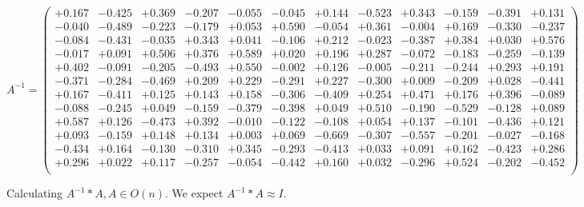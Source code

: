 \documentclass[9pt]{article}
\theoremstyle{plain}
\theoremstyle{definition}
\theoremstyle{remark}
\numberwithin{equation}{section}
\begin{document}
$A^{-1} = \left(
\begin{array}{
cccccccccccc}
+0.167 & -0.425 & +0.369 & -0.207 & -0.055 & -0.045 & +0.144 & -0.523 & +0.343 & -0.159 & -0.391 & +0.131 \\
-0.040 & -0.489 & -0.223 & -0.179 & +0.053 & +0.590 & -0.054 & +0.361 & -0.004 & +0.169 & -0.330 & -0.237 \\
-0.084 & -0.431 & -0.035 & +0.343 & +0.041 & -0.106 & +0.212 & -0.023 & -0.387 & +0.384 & +0.030 & +0.576 \\
-0.017 & +0.091 & +0.506 & +0.376 & +0.589 & +0.020 & +0.196 & +0.287 & -0.072 & -0.183 & -0.259 & -0.139 \\
+0.402 & -0.091 & -0.205 & -0.493 & +0.550 & -0.002 & +0.126 & -0.005 & -0.211 & -0.244 & +0.293 & +0.191 \\
-0.371 & -0.284 & -0.469 & +0.209 & +0.229 & -0.291 & +0.227 & -0.300 & +0.009 & -0.209 & +0.028 & -0.441 \\
+0.167 & -0.411 & +0.125 & +0.143 & +0.158 & -0.306 & -0.409 & +0.254 & +0.471 & +0.176 & +0.396 & -0.089 \\
-0.088 & -0.245 & +0.049 & -0.159 & -0.379 & -0.398 & +0.049 & +0.510 & -0.190 & -0.529 & -0.128 & +0.089 \\
+0.587 & +0.126 & -0.473 & +0.392 & -0.010 & -0.122 & -0.108 & +0.054 & +0.137 & -0.101 & -0.436 & +0.121 \\
+0.093 & -0.159 & +0.148 & +0.134 & +0.003 & +0.069 & -0.669 & -0.307 & -0.557 & -0.201 & -0.027 & -0.168 \\
-0.434 & +0.164 & -0.130 & -0.310 & +0.345 & -0.293 & -0.413 & +0.033 & +0.091 & +0.162 & -0.423 & +0.286 \\
+0.296 & +0.022 & +0.117 & -0.257 & -0.054 & -0.442 & +0.160 & +0.032 & -0.296 & +0.524 & -0.202 & -0.452 \\
\end{array}
\right)$ \newline 

Calculating $A^{-1} *A  ,  A \in O(n)$.   We expect $A^{-1} *A  \approx I$. 
\end{document}
